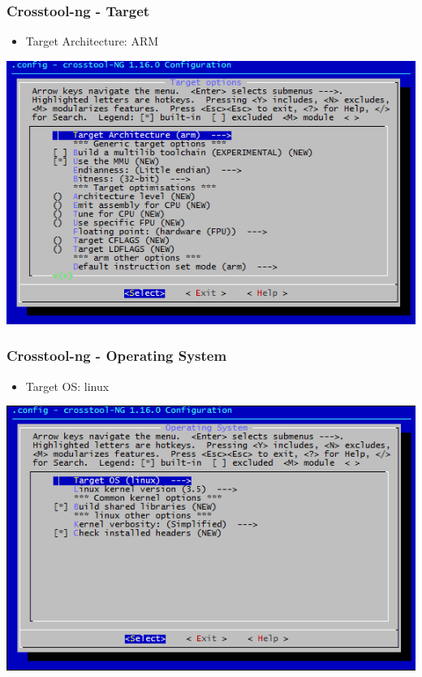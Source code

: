 \documentclass{beamer}
\begin{document}
\begin{frame}
\frametitle{Crosstool-ng - Target}
\begin{itemize}
\item Target Architecture: ARM
\end{itemize}
\begin{center}
\includegraphics[scale=.4]{image/crosstool-ng-target.png} 
\end{center}
\end{frame}

\begin{frame}
\frametitle{Crosstool-ng - Operating System}
\begin{itemize}
\item Target OS: linux
\end{itemize}
\begin{center}
\includegraphics[scale=.4]{image/crosstool-ng-os.png} 
\end{center}
\end{frame}
\end{document}
